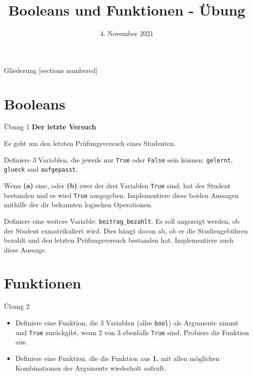 



\title{Booleans und Funktionen - Übung}
\date{4. November 2021}


\maketitle

\begin{frame}{Gliederung}
	[sections numbered]
	\tableofcontents
\end{frame}


\section{Booleans}

\begin{frame}{Übung 1}
	\textbf{Der letzte Versuch}
	\linebreak
	
	Es geht um den letzten Prüfungsversuch eines Studenten.
	
	Definiere 3 Variablen, die jeweils nur \alert{\texttt{True}} oder \alert{\texttt{False}} sein können: \texttt{gelernt}, \texttt{glueck} und \texttt{aufgepasst}.
	
	Wenn \textbf{(a)} eine, oder \textbf{(b)} zwei der drei Variablen \alert{\texttt{True}} sind, hat der Student bestanden und es wird \alert{\texttt{True}} ausgegeben. Implementiere diese beiden Aussagen mithilfe der dir bekannten logischen Operationen.
	
	Definiere eine weitere Variable: \texttt{beitrag\_bezahlt}. Es soll angezeigt werden, ob der Student exmatrikuliert wird. Dies hängt davon ab, ob er die Studiengebühren bezahlt und den letzten Prüfungsversuch bestanden hat. Implementiere auch diese Aussage.

\end{frame}

\section{Funktionen}

\begin{frame}{Übung 2}
	\begin{itemize}
		\item[\textbf{1.}] Definiere eine Funktion, die 3 Variablen (alles \alert{\texttt{bool}}) als Argumente nimmt und \alert{\texttt{True}} zurückgibt, wenn 2 von 3 ebenfalls \alert{\texttt{True}} sind. Probiere die Funktion aus.
		\item[\textbf{2.}] Definiere eine Funktion, die die Funktion aus \textbf{1.} mit allen möglichen Kombinationen der Argumente wiederholt aufruft.
	\end{itemize}

\end{frame}

